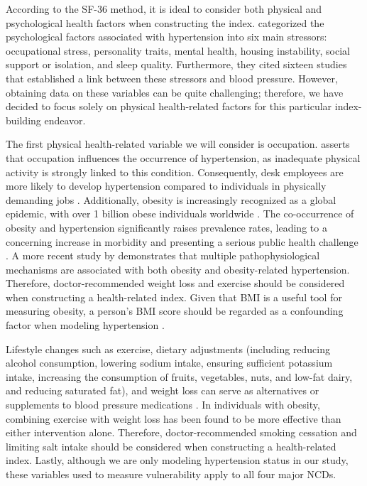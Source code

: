 \documentclass[
  12pt,
  a4paper]{article}
\begin{document}
According to the SF-36 method, it is ideal to consider both physical and psychological health factors when constructing the index. \citet{cuffee2014psychosocial} categorized the psychological factors associated with hypertension into six main stressors: occupational stress, personality traits, mental health, housing instability, social support or isolation, and sleep quality. Furthermore, they cited sixteen studies that established a link between these stressors and blood pressure. However, obtaining data on these variables can be quite challenging; therefore, we have decided to focus solely on physical health-related factors for this particular index-building endeavor.

The first physical health-related variable we will consider is occupation. \citet{grotto_hypertension_2008} asserts that occupation influences the occurrence of hypertension, as inadequate physical activity is strongly linked to this condition. Consequently, desk employees are more likely to develop hypertension compared to individuals in physically demanding jobs \citep{chomistek2012vigorous}. Additionally, obesity is increasingly recognized as a global epidemic, with over 1 billion obese individuals worldwide \citep{who_world_2022}. The co-occurrence of obesity and hypertension significantly raises prevalence rates, leading to a concerning increase in morbidity and presenting a serious public health challenge \citep{seravalle_obesity_2017}. A more recent study by \citet{seravalle2024obesity} demonstrates that multiple pathophysiological mechanisms are associated with both obesity and obesity-related hypertension. Therefore, doctor-recommended weight loss and exercise should be considered when constructing a health-related index. Given that BMI is a useful tool for measuring obesity, a person's BMI score should be regarded as a confounding factor when modeling hypertension \citep{jiang2016obesity}.

Lifestyle changes such as exercise, dietary adjustments (including reducing alcohol consumption, lowering sodium intake, ensuring sufficient potassium intake, increasing the consumption of fruits, vegetables, nuts, and low-fat dairy, and reducing saturated fat), and weight loss can serve as alternatives or supplements to blood pressure medications \citep{bacon_effects_2004}. In individuals with obesity, combining exercise with weight loss has been found to be more effective than either intervention alone. Therefore, doctor-recommended smoking cessation and limiting salt intake should be considered when constructing a health-related index. Lastly, although we are only modeling hypertension status in our study, these variables used to measure vulnerability apply to all four major NCDs.
\end{document}
